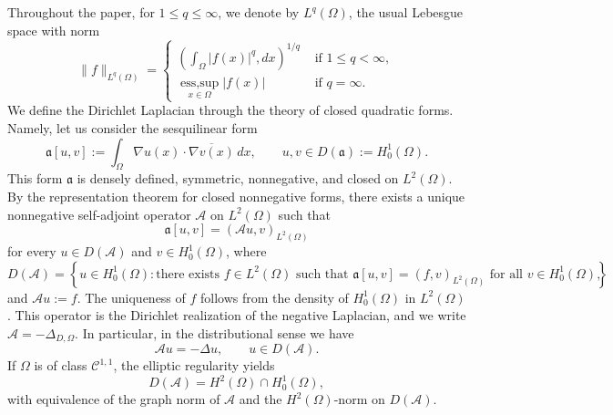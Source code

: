 \documentclass[a4paper,11pt]{article} %
\theoremstyle{remark}
\theoremstyle{definition}
\numberwithin{equation}{section}
\begin{document}
Throughout the paper, for $1\le q\le\infty$, we denote by $L^q(\Omega)$, the usual Lebesgue space with norm
$$
\|f\|_{L^q(\Omega)}
=
\begin{cases}
    \left(\displaystyle\int_\Omega |f(x)|^q,dx \right)^{1/q} &\text{ if } 1\le q<\infty, \\
    \operatorname*{ess,sup}_{x\in\Omega} |f(x)| &\text{ if } q= \infty.
\end{cases}
$$
We define the Dirichlet Laplacian through the theory of closed quadratic forms. Namely, let us consider the sesquilinear form
\begin{equation*}
\mathfrak a[u,v]
:=
\int_{\Omega}
\nabla u(x)\cdot\overline{\nabla v(x)}\,dx,
\qquad
u,v\in D(\mathfrak a):=H_0^1(\Omega).
\end{equation*}
This form \(\mathfrak a\) is densely defined, symmetric, nonnegative, and closed on \(L^2(\Omega)\). By the representation theorem for closed nonnegative forms, there
exists a unique nonnegative self-adjoint operator  \(\mathcal{A}\) on \(L^2(\Omega)\) such that
\begin{equation*}
\mathfrak a[u,v]
=
(\mathcal{A}u,v)_{L^2(\Omega)}
\end{equation*}
for every \(u\in D(\mathcal{A})\) and \(v\in H_0^1(\Omega)\), where
\begin{equation*}
D(\mathcal{A})
=
\left\{
u\in H_0^1(\Omega):
\text{there exists } f\in L^2(\Omega)
\text{ such that }
\mathfrak a[u,v]=(f,v)_{L^2(\Omega)}
\text{ for all }v\in H_0^1(\Omega)
\right\},
\end{equation*}
and \(\mathcal{A}u:=f\). The uniqueness of \(f\) follows from the density of \(H_0^1(\Omega)\) in \(L^2(\Omega)\). This operator is the Dirichlet realization of the negative Laplacian, and we write $\mathcal{A}=-\Delta_{D,\Omega}$. In particular, in the distributional sense we have
\[
\mathcal{A}u=-\Delta u,
\qquad
u\in D(\mathcal{A}).
\]
If \(\Omega\) is of class \(\mathcal{C}^{1,1}\), the elliptic regularity yields
\begin{equation*}
D(\mathcal{A})
=
H^2(\Omega)\cap H_0^1(\Omega),
\end{equation*}
with equivalence of the graph norm of \(\mathcal{A}\) and the \(H^2(\Omega)\)-norm on \(D(\mathcal{A})\).
\end{document}
